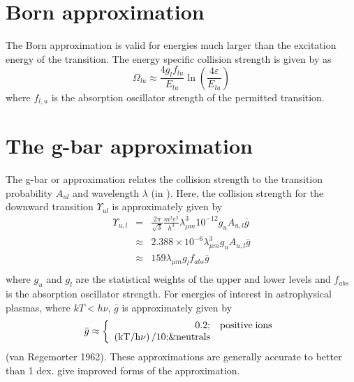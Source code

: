 \section{Born approximation }

The Born approximation is valid for energies much larger than the
excitation energy of the transition.
The energy specific collision strength
is given by \citet{Bethe1930} as
\begin{equation}
{\Omega _{lu}} \approx \frac{{4{g_l}{f_{lu}}}}{{{E_{lu}}}}\ln \left(
{\frac{{4\varepsilon }}{{{E_{lu}}}}} \right)
\end{equation}
where $f_{l,u}$ is the absorption oscillator strength of the permitted transition.

\section{The g-bar approximation }

The g-bar or \citet{VanRegemorter1962} approximation relates the collision
strength to the transition probability $A_{ul}$ and wavelength $\lambda$ (in \micron).
Here, the collision strength for the downward transition
${\Upsilon _{ul}}$
is approximately given by
\begin{equation}
\begin{array}{ccl}
 {\Upsilon _{u,l}}& =& \frac{{2\pi }}{{\sqrt 3
}}\frac{{{m^2}{e^2}}}{{{h^3}}}\lambda _{\mu m}^3{10^{ -
12}}{g_u}{A_{u,l}}\bar g \\
& \approx& 2.388 \times {10^{ - 6}}\lambda _{\mu m}^3{g_u}{A_{u,l}}\bar g \\
& \approx& 159{\lambda _{\mu m}}{g_l}{f_{abs}}\bar g \\
 \end{array}
\end{equation}
where $g_u$ and $g_l$ are the statistical weights of the
upper and lower levels
and $f_{abs}$ is the absorption oscillator strength.
For energies of interest
in astrophysical plasmas, where $kT<h\nu$, $\bar g$
is approximately given by
\begin{equation}
\bar g \approx \left\{ {\begin{array}{*{20}{c}}
   \hfill {0.2;} & \hfill {{\mathrm{positive}}\;{\mathrm{ions}}} \\
   \hfill {\left( {{\mathrm{kT/h}}\nu } \right)/10;}\& \hfill {{\mathrm{neutrals}}}
\\
\end{array}} \right.
\end{equation}
(van Regemorter 1962).
These approximations are generally accurate to better
than 1 dex.
\citet{Gaetz1983} give improved forms of the approximation.

